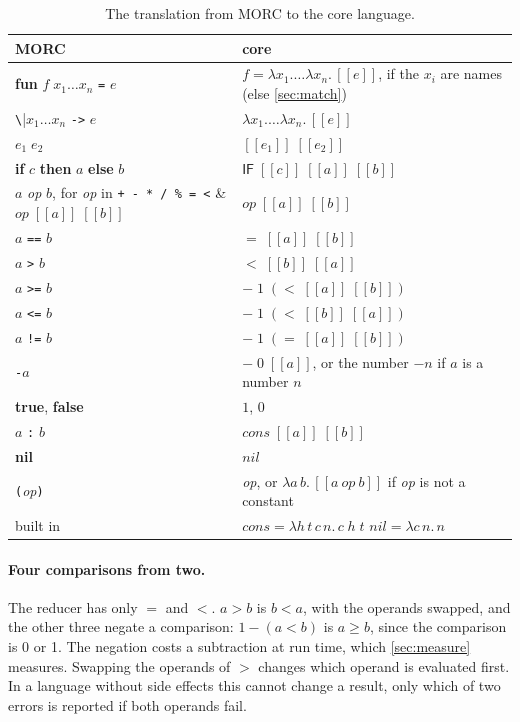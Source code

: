 \documentclass[11pt,a4paper]{article}
\newcommand{\cmb}[1]{\textsf{#1}}
\newcommand{\IF}{\cmb{IF}}
\theoremstyle{definition}
\theoremstyle{plain}
\newcommand{\tr}[1]{[\![#1]\!]}
\newcommand{\kw}[1]{\textbf{#1}}
\begin{document}
\begin{table}[t]
\centering
\small
\renewcommand{\arraystretch}{1.2}
\begin{tabular}{@{}l@{\quad}l@{}}
\toprule
MORC & core\\
\midrule
\kw{fun} $f\;x_1\ldots x_n$ \texttt{=} $e$ & $f = \lambda x_1.\ldots\lambda x_n.\,\tr{e}$, if the $x_i$ are names (else \cref{sec:match})\\
\verb|\|$x_1\ldots x_n$ \verb|->| $e$ & $\lambda x_1.\ldots\lambda x_n.\,\tr{e}$\\
$e_1\;e_2$ & $\tr{e_1}\;\tr{e_2}$\\
\kw{if} $c$ \kw{then} $a$ \kw{else} $b$ & $\IF\;\tr{c}\;\tr{a}\;\tr{b}$\\
$a$ \textit{op} $b$, for \textit{op} in \verb|+ - * / % = <| & $\textit{op}\;\tr{a}\;\tr{b}$\\
$a$ \verb|==| $b$ & ${=}\;\tr{a}\;\tr{b}$\\
$a$ \verb|>| $b$ & ${<}\;\tr{b}\;\tr{a}$\\
$a$ \verb|>=| $b$ & ${-}\;1\;({<}\;\tr{a}\;\tr{b})$\\
$a$ \verb|<=| $b$ & ${-}\;1\;({<}\;\tr{b}\;\tr{a})$\\
$a$ \verb|!=| $b$ & ${-}\;1\;({=}\;\tr{a}\;\tr{b})$\\
\verb|-|$a$ & ${-}\;0\;\tr{a}$, or the number $-n$ if $a$ is a number $n$\\
\kw{true}, \kw{false} & $1$, $0$\\
$a$ \verb|:| $b$ & $\mathit{cons}\;\tr{a}\;\tr{b}$\\
\kw{nil} & $\mathit{nil}$\\
\verb|(|\textit{op}\verb|)| & \textit{op}, or $\lambda a\,b.\,\tr{a\ \textit{op}\ b}$ if \textit{op} is not a constant\\
\midrule
built in & $\mathit{cons} = \lambda h\,t\,c\,n.\,c\;h\;t$ \qquad $\mathit{nil} = \lambda c\,n.\,n$\\
\bottomrule
\end{tabular}
\caption{The translation from MORC to the core language.}
\label{tab:core}
\end{table}

\paragraph{Four comparisons from two.} The reducer has only ${=}$ and ${<}$.
$a > b$ is $b < a$, with the operands swapped, and the other three negate a
comparison: $1 - (a < b)$ is $a \geq b$, since the comparison is 0 or 1. The
negation costs a subtraction at run time, which \cref{sec:measure} measures.
Swapping the operands of $>$ changes which operand is evaluated first. In a
language without side effects this cannot change a result, only which of
two errors is reported if both operands fail.
\end{document}
